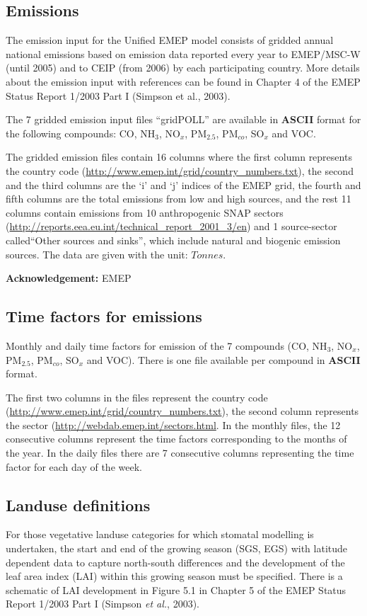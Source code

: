 \subsection{Emissions}
The emission input for the Unified EMEP model consists of gridded
annual national emissions based on emission data reported every year
to EMEP/MSC-W (until 2005) 
and to CEIP (from 2006) by each
participating country. 
More details about the emission input with references can be
found in Chapter 4 of the EMEP Status Report 1/2003 Part I 
(Simpson et al., 2003).

The 7 gridded emission input files ``gridPOLL'' are available in 
{\bf ASCII} format for the following compounds: CO, NH$_{3}$,
NO$_{x}$, PM$_{2.5}$, PM$_{co}$, SO$_{x}$ and VOC.

The gridded emission files contain 16 columns where the first column 
represents the country code
(\url{http://www.emep.int/grid/country_numbers.txt}), 
the second and the third columns are the `i' and `j' indices of the
EMEP grid, the fourth and fifth columns are the total emissions from
low and high sources, and the rest 11 columns contain emissions from 
10 anthropogenic SNAP sectors 
(\url{http://reports.eea.eu.int/technical_report_2001_3/en}) and 1 
source-sector called``Other sources and sinks'', which include natural and
biogenic emission sources. The data are given with the unit: $Tonnes$.

{\bf Acknowledgement:} EMEP

\subsection{Time factors for emissions}

Monthly and daily time factors for emission of the 7 compounds 
(CO, NH$_{3}$, NO$_{x}$, PM$_{2.5}$, PM$_{co}$, SO$_{x}$ and VOC). 
There is one file available per compound in {\bf ASCII} format. 

The first two columns in the files represent the country code
(\url{http://www.emep.int/grid/country_numbers.txt}), the second column 
represents the sector (\url{http://webdab.emep.int/sectors.html}. In the monthly files, 
the 12 consecutive columns represent the time factors corresponding to 
the months of the year. In the daily files there are 7 consecutive columns representing 
the time factor for each day of the week. 

\subsection{Landuse definitions}
For those vegetative landuse categories for which stomatal modelling is
undertaken, the start and end of the growing season (SGS, EGS) with
latitude dependent data to capture north-south differences and the
development of the leaf area index (LAI) within this growing season
must be specified. There is a schematic of LAI development in Figure
5.1 in Chapter 5 of the EMEP Status Report 1/2003 Part I (Simpson {\sl et al.}, 2003).

